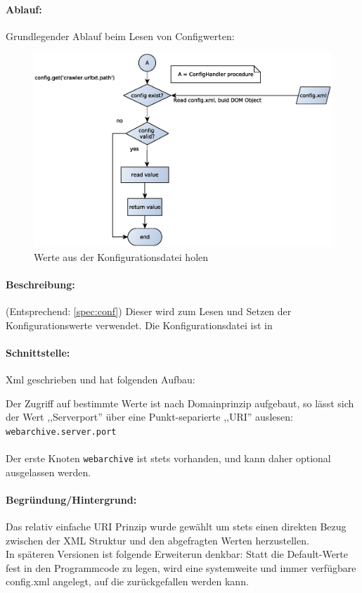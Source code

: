\paragraph{Ablauf:}
\label{par:ablauf_}
Grundlegender Ablauf beim Lesen von Configwerten:
\begin{figure}[h]
	\centering
	\label{dia:design:backend:overview}
	\includegraphics[width=\textwidth]{design/backend/gfx/getting_value.eps}
	\caption{Werte aus der Konfigurationsdatei holen}
\end{figure}

\paragraph{Beschreibung:}
(Entsprechend: \ref{spec:conf})
\label{par:beschreibung_}
Dieser wird zum Lesen und Setzen der Konfigurationswerte verwendet. Die Konfigurationsdatei ist in 
\paragraph{Schnittstelle:}
\label{par:schnittstelle_}
Xml geschrieben und hat folgenden Aufbau:
    
Der Zugriff auf bestimmte Werte ist nach Domainprinzip aufgebaut, so
lässt sich der Wert ,,Serverport'' über eine Punkt-separierte ,,URI'' auslesen: \texttt{webarchive.server.port} 
\\ \\
Der erste Knoten \texttt{webarchive} ist stets vorhanden, und kann daher optional ausgelassen werden.

\paragraph{Begründung/Hintergrund:}
\label{par:begr_ndung}
Das relativ einfache URI Prinzip wurde gewählt um stets einen direkten
Bezug zwischen der XML Struktur und den abgefragten Werten herzustellen.
\\
In späteren Versionen ist folgende Erweiterun denkbar: Statt die
Default-Werte fest in den Programmcode zu legen, wird eine systemweite
und immer verfügbare config.xml angelegt, auf die zurückgefallen werden
kann.

